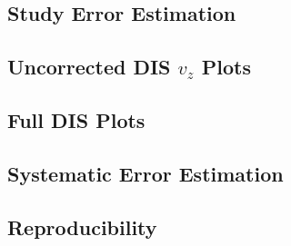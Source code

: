 \subsection*{Study Error Estimation}


\subsection*{Uncorrected DIS $v_z$ Plots}


\subsection*{Full DIS Plots}


\subsection*{Systematic Error Estimation}


\subsection*{Reproducibility}


